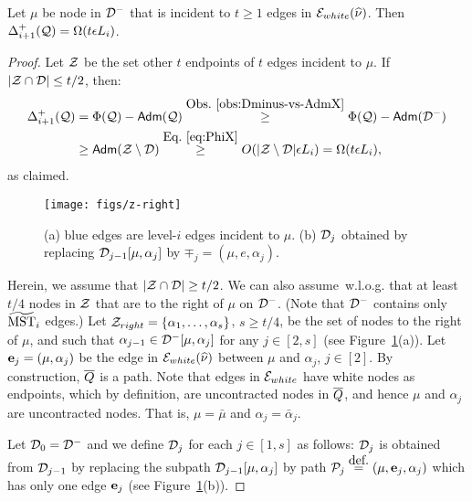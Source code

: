\begin{lemma}\label{lm:leftover-LS19} Let $\mu$ be node in $\mathcal{D}^-$ that is incident to $t \geq 1$ edges in  $\mathcal{E}_{white}(\widehat{\nu})$. Then  $\Delta^+_{i+1}(\mathcal{Q})= \Omega(t\epsilon L_i)$.
\end{lemma}
\begin{proof} Let $\mathcal{Z}$ be the set other $t$ endpoints  of $t$ edges incident to $\mu$. If $|\mathcal{Z} \cap \mathcal{D}|\leq t/2$, then:
	\begin{equation*}
		\begin{split}
			\Delta^+_{i+1}(\mathcal{Q}) &= \Phi(\mathcal{Q}) - \mathsf{Adm}(\mathcal{Q}) \stackrel{\mbox{Obs.~\ref{obs:Dminus-vs-AdmX}}}{\geq} \Phi(\mathcal{Q}) - \mathsf{Adm}(\mathcal{D}^-)\\
			&\geq \mathsf{Adm}(\mathcal{Z}\setminus \mathcal{D}) \stackrel{\mbox{Eq.~\eqref{eq:PhiX}}}{\geq} O(|\mathcal{Z}\setminus \mathcal{D}|\epsilon L_i) = \Omega(t\epsilon L_i),
		\end{split}
	\end{equation*}
	as claimed. 



\begin{wrapfigure}{r}{0.45\textwidth}
	\vspace{-35pt}
	\begin{center}
		\texttt{[image: figs/z-right]}
	\end{center}
	\caption{\footnotesize{(a) blue edges are level-$i$ edges incident to $\mu$. (b) $\mathcal{D}_j$ obtained by replacing $\mathcal{D}_{j-1}[\mu,\alpha_{j}]$ by $\mp_j = (\mu,e,\alpha_{j})$.}}
	\vspace{-5pt}
	\label{fig:z-right}
\end{wrapfigure}

Herein, we assume that  $|\mathcal{Z} \cap \mathcal{D}|\geq t/2$. We can also assume~w.l.o.g. that at least $t/4$ nodes in $\mathcal{Z}$ that are to the right of $\mu$ on $\mathcal{D}^-$. (Note that $\mathcal{D}^-$ contains only $\widetilde{\mathrm{MST}}_i$ edges.) Let $\mathcal{Z}_{right} = \{\alpha_1,\ldots, \alpha_s\}$, $s \geq t/4$,  be the set of nodes to the right of $\mu$, and such that $\alpha_{j-1}\in \mathcal{D}^{-}[\mu, \alpha_{j}]$ for any $j\in [2,s]$ (see Figure~\ref{fig:z-right}(a)). Let $\mathbf{e}_j = (\mu,\alpha_j)$ be the edge in $\mathcal{E}_{white}(\widehat{\nu})$ between $\mu$ and $\alpha_j$, $j \in [2]$. By construction, $\overline{Q}$ is  a path. Note that edges in $\mathcal{E}_{white}$ have white nodes as endpoints, which by definition, are uncontracted nodes in $\overline{Q}$, and hence $\mu$ and $\alpha_j$ are uncontracted nodes. That is, $\mu = \bar{\mu}$ and $\alpha_j = \bar{\alpha}_j$.  

Let $\mathcal{D}_0 = \mathcal{D}^-$ and we define $\mathcal{D}_j$ for each $j \in [1,s]$ as follows: $\mathcal{D}_{j}$ is obtained from $\mathcal{D}_{j-1}$ by replacing the subpath $\mathcal{D}_{j-1}[\mu, \alpha_{j}]$ by path $\mathcal{P}_{j} \stackrel{\mbox{def.}}{=} (\mu, \mathbf{e}_j, \alpha_{j})$ which has only one edge $\mathbf{e}_j$ (see Figure~\ref{fig:z-right}(b)). 


\end{proof}
